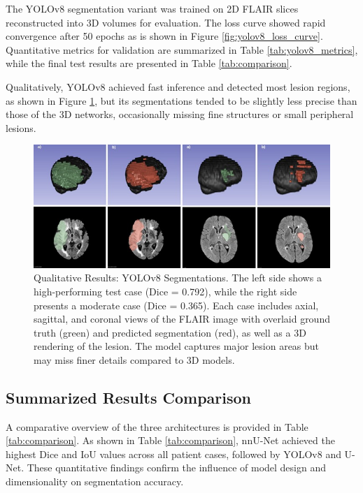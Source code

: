 \documentclass[12pt]{article}
\begin{document}
The YOLOv8 segmentation variant was trained on 2D FLAIR slices reconstructed into 3D volumes for evaluation. The loss curve showed rapid convergence after 50 epochs as is shown in Figure \ref{fig:yolov8_loss_curve}. Quantitative metrics for validation are summarized in Table \ref{tab:yolov8_metrics}, while the final test results are presented in Table \ref{tab:comparison}.

Qualitatively, YOLOv8 achieved fast inference and detected most lesion regions, as shown in Figure \ref{fig:yolov8_qualitative}, but its segmentations tended to be slightly less precise than those of the 3D networks, occasionally missing fine structures or small peripheral lesions.

\begin{figure}[tp]
    \centering
    \includegraphics[width=\textwidth]{figures/Figure 6.jpg}
    \caption{Qualitative Results: YOLOv8 Segmentations. The left side shows a high-performing test case (Dice = 0.792), while the right side presents a moderate case (Dice = 0.365). Each case includes axial, sagittal, and coronal views of the FLAIR image with overlaid ground truth (green) and predicted segmentation (red), as well as a 3D rendering of the lesion. The model captures major lesion areas but may miss finer details compared to 3D models.}
    \label{fig:yolov8_qualitative}
\end{figure}


\subsection{Summarized Results Comparison} \label{subsec:comparison}

A comparative overview of the three architectures is provided in Table \ref{tab:comparison}. As shown in Table \ref{tab:comparison}, nnU-Net achieved the highest Dice and IoU values across all patient cases, followed by YOLOv8 and U-Net. These quantitative findings confirm the influence of model design and dimensionality on segmentation accuracy.
\end{document}
